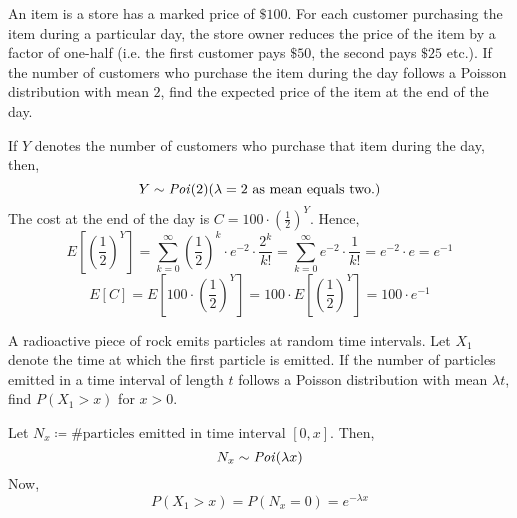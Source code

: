 \begin{example}
    An item is a store has a marked price of $\$100$. For each customer
purchasing the item during a particular day, the store owner reduces the price
of the item by a factor of one-half (i.e. the first customer pays $\$50$, the
second pays $\$25$ etc.). If the number of customers who purchase the item
during the day follows a Poisson distribution with mean $2$, find the expected
price of the item at the end of the day.
\end{example}
\begin{solution}
    If $Y$ denotes the number of customers who purchase that item during the
day, then,
    \[ Y \sim \text{\emph{Poi}}(2) (\lambda = 2 \text{ as mean equals two.}) \]
    The cost at the end of the day is $C = 100 \cdot (\frac{1}{2})^Y$. Hence, 
    \[
        E[(\frac{1}{2})^Y] = \sum_{k = 0}^\infty (\frac{1}{2})^k \cdot
                             e^{-2} \cdot \frac{2^k}{k!}
                           = \sum_{k = 0}^\infty e^{-2} \cdot \frac{1}{k!}
                           = e^{-2} \cdot e 
                           = e^{-1}
    \]
    \[
        E[C] = E[100 \cdot (\frac{1}{2})^Y]
             = 100 \cdot E[(\frac{1}{2})^Y]
             = 100 \cdot e^{-1}
    \]
\end{solution}

\begin{example}
    A radioactive piece of rock emits particles at random time intervals. Let
$X_1$ denote the time at which the first particle is emitted. If the number of
particles emitted in a time interval of length $t$ follows a Poisson
distribution with mean $\lambda t$, find $P(X_1 > x)$ for $x > 0$.
    \begin{figure*}[!htp]
        \centering
        \def\svgwidth{\textwidth}
        
    \end{figure*}
\end{example}
\begin{solution}
    Let $N_x \coloneqq \#\text{particles emitted in time interval }[0, x]$.
Then, 
    \[ N_x \sim \text{\emph{Poi}}(\lambda x) \] 
    Now, 
    \[P(X_1 > x) = P(N_x = 0) = e^{-\lambda x} \]
\end{solution}